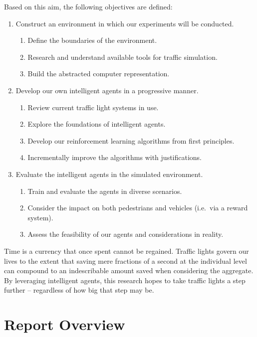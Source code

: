 \documentclass[a4paper]{report}
\begin{document}
Based on this aim, the following objectives are defined:

\begin{enumerate}
  \item Construct an environment in which our experiments will be conducted.
  \begin{enumerate}
    \item Define the boundaries of the environment.
    \item Research and understand available tools for traffic simulation.
    \item Build the abstracted computer representation.
  \end{enumerate}
  \item Develop our own intelligent agents in a progressive manner.
  \begin{enumerate}
    \item Review current traffic light systems in use.
    \item Explore the foundations of intelligent agents.
    \item Develop our reinforcement learning algorithms from first principles.
    \item Incrementally improve the algorithms with justifications.
  \end{enumerate}
  \item Evaluate the intelligent agents in the simulated environment.
  \begin{enumerate}
    \item Train and evaluate the agents in diverse scenarios.
    \item Consider the impact on both pedestrians and vehicles (i.e.\ via a reward system).
    \item Assess the feasibility of our agents and considerations in reality.
  \end{enumerate}
\end{enumerate}

Time is a currency that once spent cannot be regained. Traffic lights govern our lives to the extent that saving mere fractions of a second at the individual level can compound to an indescribable amount saved when considering the aggregate. By leveraging intelligent agents, this research hopes to take traffic lights a step further -- regardless of how big that step may be.

\section{Report Overview}
\end{document}
